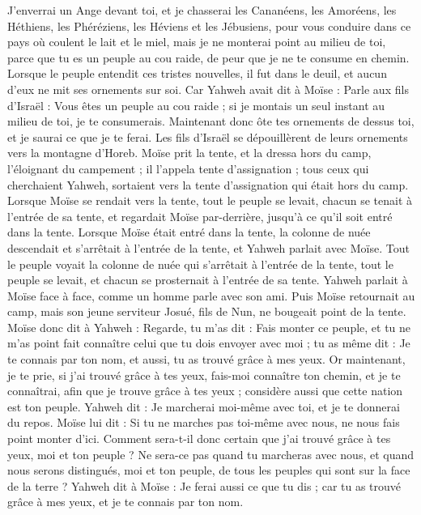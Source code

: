 \begin{multicols}{2}
J'enverrai un Ange devant toi, et je chasserai les Cananéens, les Amoréens, les Héthiens, les Phéréziens, les Héviens et les Jébusiens,
pour vous conduire dans ce pays où coulent le lait et le miel, mais je ne monterai point au milieu de toi, parce que tu es un peuple au cou raide, de peur que je ne te consume en chemin.
Lorsque le peuple entendit ces tristes nouvelles, il fut dans le deuil, et aucun d'eux ne mit ses ornements sur soi.
Car Yahweh avait dit à Moïse : Parle aux fils d'Israël : Vous êtes un peuple au cou raide ; si je montais un seul instant au milieu de toi, je te consumerais. Maintenant donc ôte tes ornements de dessus toi, et je saurai ce que je te ferai.
Les fils d'Israël se dépouillèrent de leurs ornements vers la montagne d'Horeb.
Moïse prit la tente, et la dressa hors du camp, l'éloignant du campement ; il l'appela tente d'assignation ; tous ceux qui cherchaient Yahweh, sortaient vers la tente d'assignation qui était hors du camp.
Lorsque Moïse se rendait vers la tente, tout le peuple se levait, chacun se tenait à l'entrée de sa tente, et regardait Moïse par-derrière, jusqu’à ce qu'il soit entré dans la tente.
Lorsque Moïse était entré dans la tente, la colonne de nuée descendait et s'arrêtait à l’entrée de la tente, et Yahweh parlait avec Moïse.
Tout le peuple voyait la colonne de nuée qui s’arrêtait à l’entrée de la tente, tout le peuple se levait, et chacun se prosternait à l’entrée de sa tente.
Yahweh parlait à Moïse face à face, comme un homme parle avec son ami. Puis Moïse retournait au camp, mais son jeune serviteur Josué, fils de Nun, ne bougeait point de la tente\FTNT{}.
Moïse donc dit à Yahweh : Regarde, tu m'as dit : Fais monter ce peuple, et tu ne m'as point fait connaître celui que tu dois envoyer avec moi ; tu as même dit : Je te connais par ton nom, et aussi, tu as trouvé grâce à mes yeux.
Or maintenant, je te prie, si j'ai trouvé grâce à tes yeux, fais-moi connaître ton chemin, et je te connaîtrai, afin que je trouve grâce à tes yeux ; considère aussi que cette nation est ton peuple\FTNT{}.
Yahweh dit : Je marcherai moi-même avec toi, et je te donnerai du repos.
Moïse lui dit : Si tu ne marches pas toi-même avec nous, ne nous fais point monter d'ici.
Comment sera-t-il donc certain que j’ai trouvé grâce à tes yeux, moi et ton peuple ? Ne sera-ce pas quand tu marcheras avec nous, et quand nous serons distingués, moi et ton peuple, de tous les peuples qui sont sur la face de la terre ?
Yahweh dit à Moïse : Je ferai aussi ce que tu dis ; car tu as trouvé grâce à mes yeux, et je te connais par ton nom.

\end{multicols}
